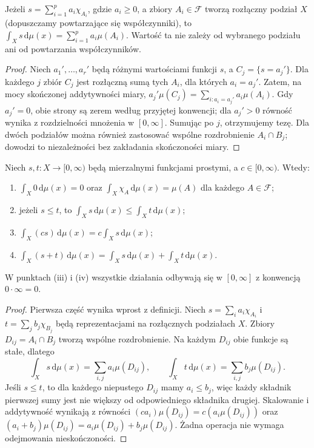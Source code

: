 \begin{lemat}
\label{lem:simple-refinement}
Jeżeli $s=\sum_{i=1}^p a_i\chi_{A_i}$, gdzie
$a_i\ge0$, a zbiory $A_i\in\mathcal F$ tworzą
rozłączny podział $X$ (dopuszczamy powtarzające się
współczynniki), to
$\int_Xs\,\mathrm d\mu(x)=\sum_{i=1}^pa_i\mu(A_i)$.
Wartość ta nie zależy od wybranego podziału ani od
powtarzania współczynników.
\end{lemat}
\begin{proof}
Niech $a_1',\ldots,a_r'$ będą różnymi wartościami
funkcji $s$, a $C_j=\{s=a_j'\}$. Dla każdego $j$
zbiór $C_j$ jest rozłączną sumą tych $A_i$, dla których
$a_i=a_j'$. Zatem, na mocy skończonej addytywności miary,
$a_j'\mu(C_j)=\sum_{i:a_i=a_j'}a_i\mu(A_i)$.
Gdy $a_j'=0$, obie strony są zerem według przyjętej
konwencji; dla $a_j'>0$ równość wynika z rozdzielności
mnożenia w $[0,\infty]$. Sumując po $j$, otrzymujemy
tezę. Dla dwóch podziałów można również zastosować
wspólne rozdrobnienie $A_i\cap B_j$; dowodzi to
niezależności bez zakładania skończoności miary.
\end{proof}

\begin{twierdzenie}
\label{thm:simple-properties}
Niech $s,t:X\to[0,\infty)$ będą mierzalnymi funkcjami
prostymi, a $c\in[0,\infty)$. Wtedy:
\begin{enumerate}[label=\textup{(\roman*)}]
\item $\int_X0\,\mathrm d\mu(x)=0$ oraz
$\int_X\chi_A\,\mathrm d\mu(x)=\mu(A)$ dla każdego
$A\in\mathcal F$;
\item jeżeli $s\le t$, to
$\int_Xs\,\mathrm d\mu(x)\le\int_Xt\,\mathrm d\mu(x)$;
\item $\int_X(cs)\,\mathrm d\mu(x)=c\int_Xs\,\mathrm d\mu(x)$;
\item $\int_X(s+t)\,\mathrm d\mu(x)=
\int_Xs\,\mathrm d\mu(x)+\int_Xt\,\mathrm d\mu(x)$.
\end{enumerate}
W punktach (iii) i (iv) wszystkie działania odbywają się
w $[0,\infty]$ z konwencją $0\cdot\infty=0$.
\end{twierdzenie}
\begin{proof}
Pierwsza część wynika wprost z definicji. Niech
$s=\sum_i a_i\chi_{A_i}$ i
$t=\sum_j b_j\chi_{B_j}$ będą reprezentacjami
na rozłącznych podziałach $X$. Zbiory
$D_{ij}=A_i\cap B_j$ tworzą wspólne rozdrobnienie.
Na każdym $D_{ij}$ obie funkcje są stałe, dlatego
\[
\int_Xs\,\mathrm d\mu(x)=\sum_{i,j}a_i\mu(D_{ij}),\qquad
\int_Xt\,\mathrm d\mu(x)=\sum_{i,j}b_j\mu(D_{ij}).
\]
Jeśli $s\le t$, to dla każdego niepustego $D_{ij}$
mamy $a_i\le b_j$, więc każdy składnik pierwszej sumy
jest nie większy od odpowiedniego składnika drugiej.
Skalowanie i addytywność wynikają z równości
$(ca_i)\mu(D_{ij})=c(a_i\mu(D_{ij}))$ oraz
$(a_i+b_j)\mu(D_{ij})=a_i\mu(D_{ij})+b_j\mu(D_{ij})$.
Żadna operacja nie wymaga odejmowania nieskończoności.
\end{proof}


